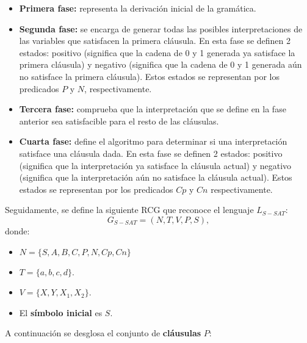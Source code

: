 \begin{itemize}
    \item \textbf{Primera fase:} representa la derivación inicial de la gramática.
    \item \textbf{Segunda fase:} se encarga de generar todas las posibles interpretaciones
          de las variables que satisfacen la primera cláusula. En esta fase se definen 2 estados: positivo (significa
          que la cadena de 0 y 1 generada ya satisface la primera cláusula) y negativo (significa que la cadena de 0 y 1
          generada aún no satisface la primera cláusula). Estos estados se representan por los predicados $P$ y $N$, respectivamente.
          
    \item \textbf{Tercera fase:} comprueba que la interpretación que se define en la fase anterior sea satisfacible para
          el resto de las cláusulas.
    \item \textbf{Cuarta fase:} define el algoritmo para determinar si una interpretación satisface una cláusula
          dada. En esta fase se definen 2 estados: positivo (significa que la interpretación ya satisface la cláusula 
          actual) y negativo (significa que la interpretación aún no satisface la cláusula actual). Estos estados se representan por los predicados $Cp$ y $Cn$ respectivamente.
          
\end{itemize}

Seguidamente, se define la siguiente RCG que reconoce el lenguaje $L_{S-SAT}$:
\[
    G_{S-SAT} = (N, T, V, P, S),
\]
donde:

\begin{itemize}
    \item $N=\{S,A,B,C,P,N,Cp,Cn\}$
    \item $T=\{a,b,c,d\}$.
    \item $V=\{X,Y,X_1,X_2\}$.
    \item El \textbf{símbolo inicial} es $S$.
\end{itemize}

A continuación se desglosa el conjunto de \textbf{cláusulas} $P$:

